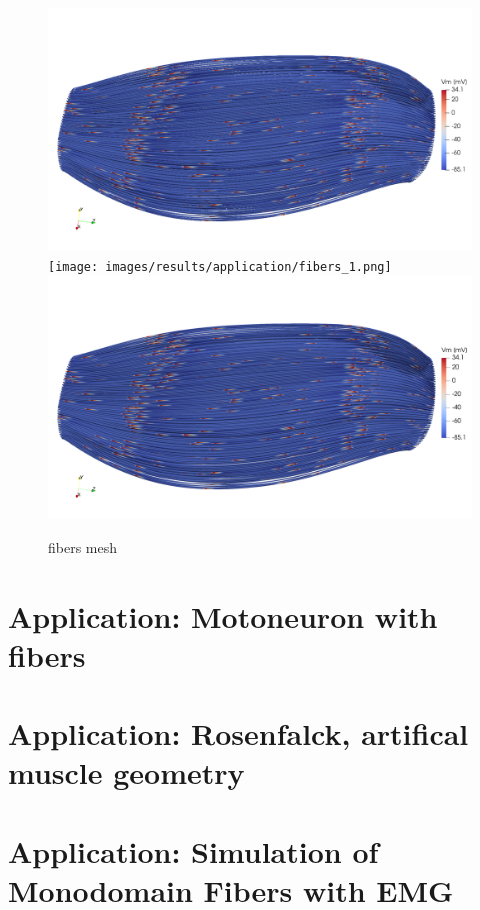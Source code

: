\begin{figure}[H]
  \centering%
  \includegraphics[width=\textwidth]{images/results/application/fibers_0.png}%
  \texttt{[image: images/results/application/fibers\_1.png]}%
  \includegraphics[width=\textwidth]{images/results/application/fibers_2.png}%
  \caption{fibers mesh}%
  \label{fig:multidomain_mesh}%
\end{figure}

\section{Application: Motoneuron with fibers}
\section{Application: Rosenfalck, artifical muscle geometry}
\section{Application: Simulation of Monodomain Fibers with EMG}

